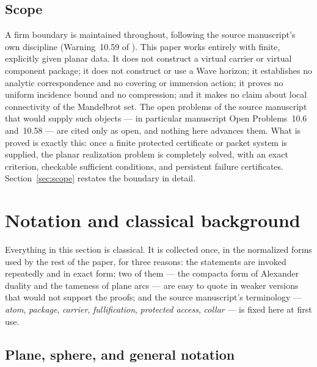 \documentclass[11pt,reqno]{amsart}
\theoremstyle{definition}
\theoremstyle{remark}
\begin{document}
\subsection{Scope}\label{subsec:A-scope}

A firm boundary is maintained throughout, following the source manuscript's
own discipline (Warning~10.59 of \cite{MWman}).  This paper works entirely
with finite, explicitly given planar data.  It does not construct a virtual
carrier or virtual component package; it does not construct or use a Wave
horizon; it establishes no analytic correspondence and no covering or
immersion action; it proves no uniform incidence bound and no compression;
and it makes no claim about local connectivity of the Mandelbrot set.  The
open problems of the source manuscript that would supply such objects --- in
particular manuscript Open Problems~10.6 and~10.58 --- are cited only as
open, and nothing here advances them.  What is proved is exactly this: once
a finite protected certificate or packet system is supplied, the planar
realization problem is completely solved, with an exact criterion, checkable
sufficient conditions, and persistent failure certificates.
Section~\ref{sec:scope} restates the boundary in detail.


\section{Notation and classical background}\label{sec:prelim}

Everything in this section is classical.  It is collected once, in the
normalized forms used by the rest of the paper, for three reasons: the
statements are invoked repeatedly and in exact form; two of them --- the
compacta form of Alexander duality and the tameness of plane arcs --- are
easy to quote in weaker versions that would not support the proofs; and the
source manuscript's terminology --- \emph{atom}, \emph{package},
\emph{carrier}, \emph{fullification}, \emph{protected access},
\emph{collar} --- is fixed here at first use.

\subsection{Plane, sphere, and general notation}\label{subsec:A-notation}
\end{document}
